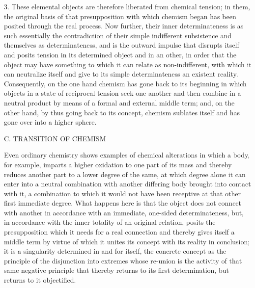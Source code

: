 3. These elemental objects are therefore
liberated from chemical tension;
in them, the original basis of
that presupposition with which chemism began
has been posited through the real process.
Now further, their inner determinateness is
as such essentially the contradiction
of their simple indifferent subsistence
and themselves as determinateness,
and is the outward impulse that disrupts itself
and posits tension in its determined object
and in an other, in order that the object
may have something to which it can relate as non-indifferent,
with which it can neutralize itself
and give to its simple determinateness an existent reality.
Consequently, on the one hand
chemism has gone back to its beginning
in which objects in a state of reciprocal tension
seek one another and then combine in a neutral product
by means of a formal and external middle term;
and, on the other hand,
by thus going back to its concept,
chemism sublates itself
and has gone over into a higher sphere.

C. TRANSITION OF CHEMISM

Even ordinary chemistry shows examples of
chemical alterations in which a body, for example,
imparts a higher oxidation to one part of its mass
and thereby reduces another part to a lower degree of the same,
at which degree alone it can enter into a neutral combination
with another differing body brought into contact with it,
a combination to which it would not have been receptive
at that other first immediate degree.
What happens here is that the object does not connect
with another in accordance with an immediate, one-sided determinateness,
but, in accordance with the inner totality of an original relation,
posits the presupposition which it needs for a real connection
and thereby gives itself a middle term by virtue of which
it unites its concept with its reality in conclusion;
it is a singularity determined in and for itself,
the concrete concept as the principle of the disjunction
into extremes whose re-union is the activity of
that same negative principle that thereby
returns to its first determination,
but returns to it objectified.

